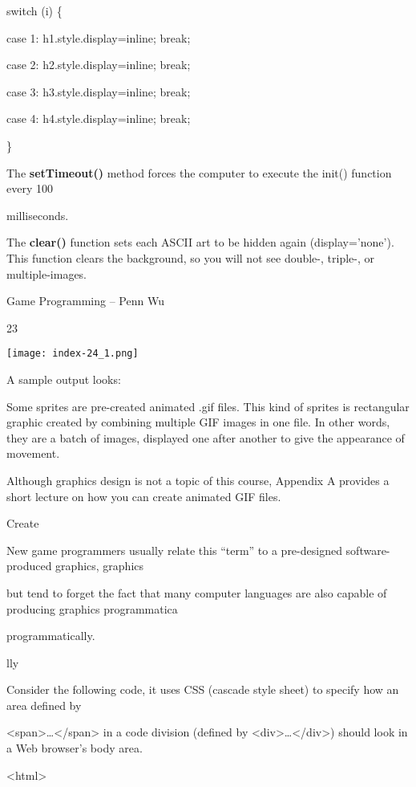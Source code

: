 \documentclass[
]{article}
\begin{document}
switch (i) \{

case 1: h1.style.display=\textquotesingle inline\textquotesingle; break;

case 2: h2.style.display=\textquotesingle inline\textquotesingle; break;

case 3: h3.style.display=\textquotesingle inline\textquotesingle; break;

case 4: h4.style.display=\textquotesingle inline\textquotesingle; break;

\}

The \textbf{setTimeout()} method forces the computer to execute the
init() function every 100

milliseconds.

The \textbf{clear()} function sets each ASCII art to be hidden again
(display='none'). This function clears the background, so you will not
see double-, triple-, or multiple-images.

Game Programming -- Penn Wu

23

\protect\hypertarget{index_split_003.htmlux5cux23p24}{}{}\texttt{[image: index-24\_1.png]}

A sample output looks:

Some sprites are pre-created animated .gif files. This kind of sprites
is rectangular graphic created by combining multiple GIF images in one
file. In other words, they are a batch of images, displayed one after
another to give the appearance of movement.

Although graphics design is not a topic of this course, Appendix A
provides a short lecture on how you can create animated GIF files.

Create

New game programmers usually relate this ``term'' to a pre-designed
software-produced graphics, graphics

but tend to forget the fact that many computer languages are also
capable of producing graphics programmatica

programmatically.

lly

Consider the following code, it uses CSS (cascade style sheet) to
specify how an area defined by

\textless span\textgreater\ldots\textless/span\textgreater{} in a code
division (defined by
\textless div\textgreater\ldots\textless/div\textgreater) should look in
a Web browser's body area.

\textless html\textgreater{}
\end{document}
